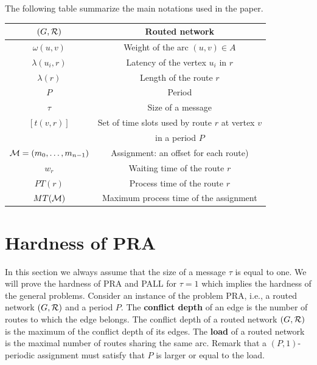 \documentclass[a4paper,10pt]{article}
\begin{document}
{     
      The following table summarize the main notations used in the paper.
      \begin{center}
   \begin{tabular}{|c|c|}
    \hline
     $(G,\cal R)$ & Routed network \\
     \hline
      $\omega(u,v)$ & Weight of the arc $(u,v) \in A$ \\
      \hline
      $\lambda(u_i,r)$ & Latency of the vertex $u_i$ in $r$\\
         \hline
         $\lambda(r)$ & Length of the route $r$\\
         \hline
         $P$ & Period\\
         \hline
         $\tau$ & Size of a message\\
         \hline
         $ [t(v,r)]$& Set of time slots used by route $r$ at vertex $v$ \\
         & in a period $P$\\
         \hline 
         ${\cal M}=(m_0, \ldots ,m_{n-1})$& Assignment: an offset for each route)\\
              \hline 
         $w_r$& Waiting time of the route $r$\\
            \hline 
         $PT(r)$& Process time of the route $r$\\
           \hline 
         $MT({\cal M})$& Maximum process time of the assignment\\
    \hline

      \end{tabular}
      \end{center}


\section{Hardness of PRA}
  \label{sec:complexity}

 In this section we always assume that the size of a message $\tau$ is equal to one. 
 We will prove the hardness of PRA and PALL for $\tau =1$ which implies the hardness of the general problems. 
Consider an instance of the problem PRA, i.e., a routed network $(G,\cal{R})$ and a period $P$.
The {\bf conflict depth} of an edge is the number of routes to which the edge belongs. 
The conflict depth of a routed network $(G,\cal{R})$ is the maximum of the conflict depth of its edges.
The {\bf load} of a routed network is the maximal number of routes sharing the same arc.
Remark that a $(P,1)$-periodic assignment must satisfy that $P$ is larger or equal to the load.


}
\end{document}
